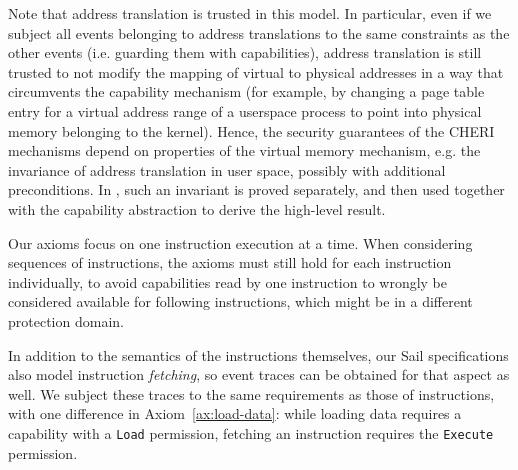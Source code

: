 \documentclass[11pt]{article}
\theoremstyle{definition}
\newcommand{\Note}[1]{{\color{magenta}[#1]}}
\begin{document}
Note that address translation is trusted in this model.  In particular, even if
we subject all events belonging to address translations to the same constraints
as the other events (i.e. guarding them with capabilities), address
translation is still trusted to not modify the mapping of virtual to physical
addresses in a way that circumvents the capability mechanism (for example, by
changing a page table entry for a virtual address range of a userspace process
to point into physical memory belonging to the kernel).  Hence, the security
guarantees of the CHERI mechanisms depend on properties of the virtual memory
mechanism, e.g. the invariance of address translation in user space, possibly
with additional preconditions.
In \cite{cheri-arw18}, such an invariant is proved separately, and then used together
with the capability abstraction to derive the high-level result.

Our axioms focus on one instruction execution at a time.  When
considering sequences of instructions, the axioms must still hold for each instruction individually, to avoid capabilities read by one
instruction to wrongly be considered available for following instructions, which might be in a different
protection domain.

In addition to the semantics of the instructions themselves, our Sail
specifications also model instruction \emph{fetching}, so event traces can be
obtained for that aspect as well.  We subject these traces to the same
requirements as those of instructions, with one difference in
Axiom~\ref{ax:load-data}: while loading data requires a capability with a
\verb|Load| permission, fetching an instruction requires the \verb|Execute|
permission.


%
\end{document}
